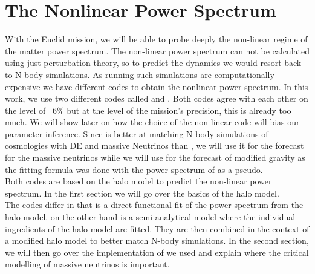 \documentclass[../main.tex]{subfiles}
\begin{document}
 \chapter{The Nonlinear Power Spectrum}\label{cha:NL}
With the Euclid mission, we will be able to probe deeply the non-linear regime of the matter power spectrum. The non-linear power spectrum can not be calculated using just perturbation theory, so to predict the dynamics we would resort back to N-body simulations. As running such simulations are computationally expensive we have different codes to obtain the nonlinear power spectrum. In this work, we use two different codes called \halofit\cite{Mead:2020vgs} and \hmcode\cite{Takahashi:2019hth}. Both codes agree with each other on the level of ~6\% but at the level of the \Euclid mission's precision, this is already too much. We will show later on how the choice of the non-linear code will bias our parameter inference. Since \hmcode is better at matching N-body simulations of cosmologies with DE and massive Neutrinos than \halofit, we will use it for the forecast for the massive neutrinos while we will use \halofit for the forecast of modified gravity as the fitting formula was done with the power spectrum of \halofit as a pseudo.\\
Both codes are based on the halo model to predict the non-linear power spectrum. In the first section we will go over the basics of the halo model.\\
The codes differ in that \halofit is a direct functional fit of the power spectrum from the halo model. \hmcode on the other hand is a semi-analytical model where the individual ingredients of the halo model are fitted. They are then combined in the context of a modified halo model to better match N-body simulations. In the second section, we will then go over the implementation of \hmcode we used and explain where the critical modelling of massive neutrinos is important.\\
\end{document}
